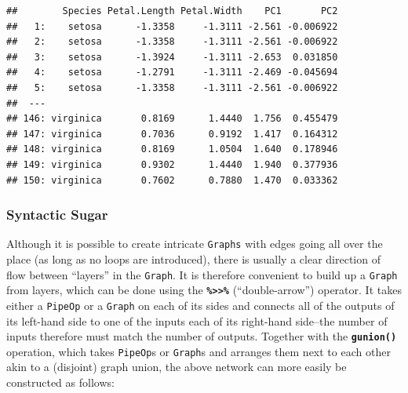 \documentclass[]{scrbook}
\newenvironment{Shaded}{\begin{snugshade}}{\end{snugshade}}
\newcommand{\DataTypeTok}[1]{\textcolor[rgb]{0.13,0.29,0.53}{#1}}
\newcommand{\DecValTok}[1]{\textcolor[rgb]{0.00,0.00,0.81}{#1}}
\newcommand{\KeywordTok}[1]{\textcolor[rgb]{0.13,0.29,0.53}{\textbf{#1}}}
\newcommand{\NormalTok}[1]{#1}
\newcommand{\OperatorTok}[1]{\textcolor[rgb]{0.81,0.36,0.00}{\textbf{#1}}}
\newcommand{\OtherTok}[1]{\textcolor[rgb]{0.56,0.35,0.01}{#1}}
\newcommand{\StringTok}[1]{\textcolor[rgb]{0.31,0.60,0.02}{#1}}
\renewenvironment{Shaded} {\begin{snugshade}\small} {\end{snugshade}}
\begin{document}
\begin{verbatim}
##        Species Petal.Length Petal.Width    PC1       PC2
##   1:    setosa      -1.3358     -1.3111 -2.561 -0.006922
##   2:    setosa      -1.3358     -1.3111 -2.561 -0.006922
##   3:    setosa      -1.3924     -1.3111 -2.653  0.031850
##   4:    setosa      -1.2791     -1.3111 -2.469 -0.045694
##   5:    setosa      -1.3358     -1.3111 -2.561 -0.006922
##  ---                                                    
## 146: virginica       0.8169      1.4440  1.756  0.455479
## 147: virginica       0.7036      0.9192  1.417  0.164312
## 148: virginica       0.8169      1.0504  1.640  0.178946
## 149: virginica       0.9302      1.4440  1.940  0.377936
## 150: virginica       0.7602      0.7880  1.470  0.033362
\end{verbatim}

\hypertarget{syntactic-sugar}{%
\subsubsection{Syntactic Sugar}\label{syntactic-sugar}}

Although it is possible to create intricate \texttt{Graphs} with edges going all over the place (as long as no loops are introduced), there is usually a clear direction of flow between ``layers'' in the \texttt{Graph}.
It is therefore convenient to build up a \texttt{Graph} from layers, which can be done using the \textbf{\texttt{\%\textgreater{}\textgreater{}\%}} (``double-arrow'') operator.
It takes either a \texttt{PipeOp} or a \texttt{Graph} on each of its sides and connects all of the outputs of its left-hand side to one of the inputs each of its right-hand side--the number of inputs therefore must match the number of outputs.
Together with the \textbf{\texttt{gunion()}} operation, which takes \texttt{PipeOp}s or \texttt{Graph}s and arranges them next to each other akin to a (disjoint) graph union, the above network can more easily be constructed as follows:

\begin{Shaded}
\end{Shaded}
\end{document}

